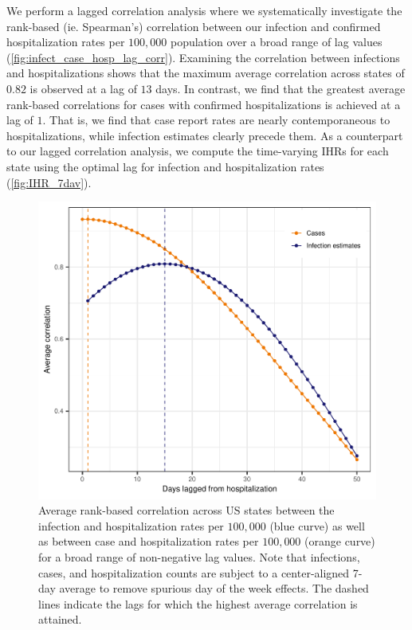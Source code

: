 \documentclass{article}
\begin{document}
We perform a lagged correlation analysis where we systematically investigate the
rank-based (ie. Spearman's) correlation between our infection and confirmed
hospitalization rates per $100,000$ population over a broad range of lag values
(\autoref{fig:infect_case_hosp_lag_corr}). Examining the correlation between infections and
hospitalizations shows that the maximum average correlation across states of $0.82$ is 
observed at a lag of $13$ days. In contrast, we find that the greatest average
rank-based correlations for cases with confirmed hospitalizations is achieved at a lag of
$1$. That is, we find that case report rates are nearly contemporaneous to
hospitalizations, while infection estimates clearly precede them. As a counterpart to our
lagged correlation analysis, we compute the time-varying IHRs for each state using the
optimal lag for infection and hospitalization rates (\autoref{fig:IHR_7dav}). 

\begin{figure}[!tb]
\centering
    \includegraphics[width=.80\textwidth, height=.44\textheight]{infect_case_hosp_lag_corr.pdf} 
    \caption{Average rank-based correlation across US states between the infection and 
    hospitalization rates per $100,000$ (blue curve) as well as between case and 
    hospitalization rates per $100,000$ (orange curve) for a broad range of non-negative
     lag values. Note that infections, cases, and hospitalization counts are subject 
     to a center-aligned 7-day average to remove spurious day of the week effects. 
     The dashed lines indicate the lags for which the highest average correlation is attained.}
    \label{fig:infect_case_hosp_lag_corr}
\end{figure}
\end{document}
